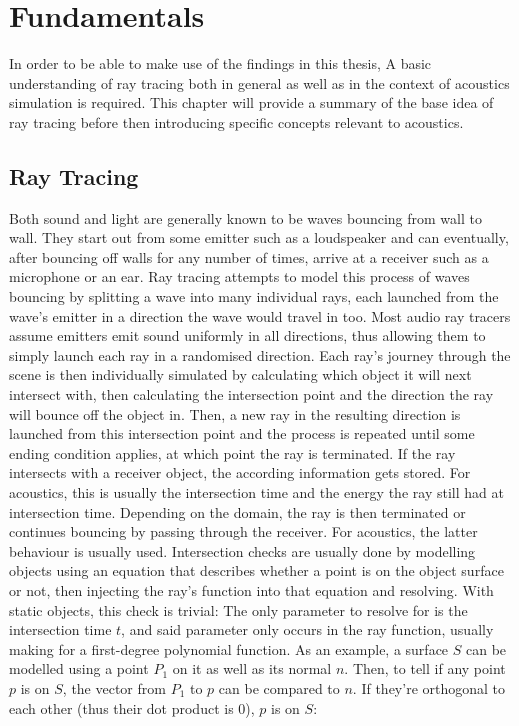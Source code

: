 \chapter{Fundamentals}\label{ch:Fundamentals}

In order to be able to make use of the findings in this thesis,
A basic understanding of ray tracing both in general as well as in the context of acoustics simulation is required.
This chapter will provide a summary of the base idea of ray tracing
before then introducing specific concepts relevant to acoustics.

\section{Ray Tracing}\label{sec:FundamentalRT}

Both sound and light are generally known to be waves bouncing from wall to wall.
They start out from some emitter such as a loudspeaker and can eventually,
after bouncing off walls for any number of times, arrive at a receiver such as a microphone or an ear.
Ray tracing attempts to model this process of waves bouncing by splitting a wave into many individual rays,
each launched from the wave's emitter in a direction the wave would travel in too.
Most audio ray tracers assume emitters emit sound uniformly in all directions,
thus allowing them to simply launch each ray in a randomised direction.
\newline
Each ray's journey through the scene is then individually simulated
by calculating which object it will next intersect with,
then calculating the intersection point and the direction the ray will bounce off the object in.
Then, a new ray in the resulting direction is launched from this intersection point and the process is repeated
until some ending condition applies, at which point the ray is terminated.
If the ray intersects with a receiver object, the according information gets stored.
For acoustics, this is usually the intersection time and the energy the ray still had at intersection time.
Depending on the domain, the ray is then terminated or continues bouncing by passing through the receiver.
For acoustics, the latter behaviour is usually used.
\newline
Intersection checks are usually done by modelling objects using an equation that describes whether a point is on the object surface or not,
then injecting the ray's function into that equation and resolving.
With static objects, this check is trivial:
The only parameter to resolve for is the intersection time \(t\), and said parameter only occurs in the ray function,
usually making for a first-degree polynomial function.
\newline
As an example, a surface \(S\) can be modelled using a point \(P_1\) on it as well as its normal \(n\).
Then, to tell if any point \(p\) is on \(S\), the vector from \(P_1\) to \(p\) can be compared to \(n\).
If they're orthogonal to each other (thus their dot product is 0), \(p\) is on \(S\):

